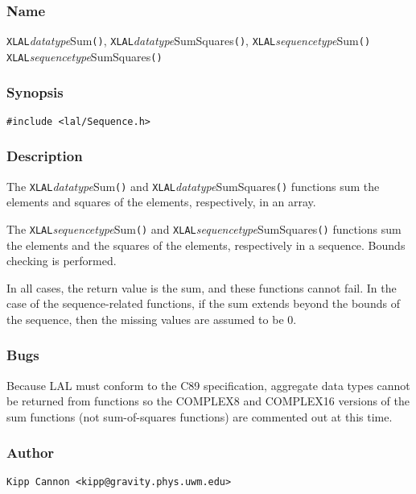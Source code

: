 \subsubsection{Name}

\texttt{XLAL}\textit{datatype}Sum\texttt{()},
\texttt{XLAL}\textit{datatype}SumSquares\texttt{()},
\texttt{XLAL}\textit{sequencetype}Sum\texttt{()}
\texttt{XLAL}\textit{sequencetype}SumSquares\texttt{()}

\subsubsection{Synopsis}

\begin{verbatim}
#include <lal/Sequence.h>
\end{verbatim}


\subsubsection{Description}

The \texttt{XLAL}\textit{datatype}Sum\texttt{()} and
\texttt{XLAL}\textit{datatype}SumSquares\texttt{()} functions sum the
elements and squares of the elements, respectively, in an array.

The \texttt{XLAL}\textit{sequencetype}Sum\texttt{()} and
\texttt{XLAL}\textit{sequencetype}SumSquares\texttt{()} functions sum the
elements and the squares of the elements, respectively in a sequence.
Bounds checking is performed.

In all cases, the return value is the sum, and these functions cannot fail.
In the case of the sequence-related functions, if the sum extends beyond
the bounds of the sequence, then the missing values are assumed to be 0.

\subsubsection{Bugs}

Because LAL must conform to the C89 specification, aggregate data types
cannot be returned from functions so the COMPLEX8 and COMPLEX16 versions of
the sum functions (not sum-of-squares functions) are commented out at this
time.

\subsubsection{Author}

\verb|Kipp Cannon <kipp@gravity.phys.uwm.edu>|
